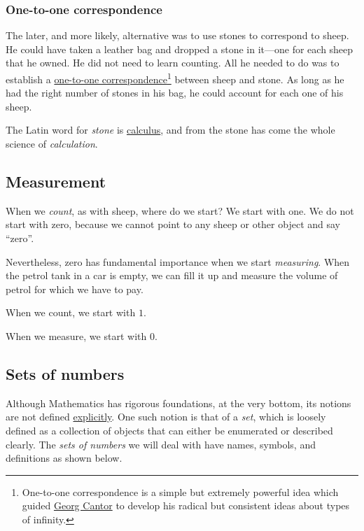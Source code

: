 \documentclass[
  a4paper,
]{article}
\begin{document}
\hypertarget{one-to-one-correspondence}{%
\subsubsection{One-to-one
correspondence}\label{one-to-one-correspondence}}

The later, and more likely, alternative was to use stones to correspond
to sheep. He could have taken a leather bag and dropped a stone in
it---one for each sheep that he owned. He did not need to learn
counting. All he needed to do was to establish a
\href{https://www.encyclopedia.com/science/encyclopedias-almanacs-transcripts-and-maps/one-one-correspondence}{one-to-one
correspondence}\footnote{One-to-one correspondence is a simple but
  extremely powerful idea which guided
  \href{https://www.britannica.com/science/one-to-one-correspondence}{Georg
  Cantor} to develop his radical but consistent ideas about types of
  infinity.} between sheep and stone. As long as he had the right number
of stones in his bag, he could account for each one of his sheep.

The Latin word for \emph{stone} is
\href{https://www.etymonline.com/search?q=calculus}{calculus}, and from
the stone has come the whole science of \emph{calculation}.

\hypertarget{measurement}{%
\subsection{Measurement}\label{measurement}}

When we \emph{count}, as with sheep, where do we start? We start with
one. We do not start with zero, because we cannot point to any sheep or
other object and say ``zero''.

Nevertheless, zero has fundamental importance when we start
\emph{measuring}. When the petrol tank in a car is empty, we can fill it
up and measure the volume of petrol for which we have to pay.

When we count, we start with \(1\).

When we measure, we start with \(0\).

\hypertarget{sets-of-numbers}{%
\subsection{Sets of numbers}\label{sets-of-numbers}}

Although Mathematics has rigorous foundations, at the very bottom, its
notions are not defined
\href{https://www.vocabulary.com/dictionary/explicitly}{explicitly}. One
such notion is that of a \emph{set}, which is loosely defined as a
collection of objects that can either be enumerated or described
clearly. The \emph{sets of numbers} we will deal with have names,
symbols, and definitions as shown below.
\end{document}
